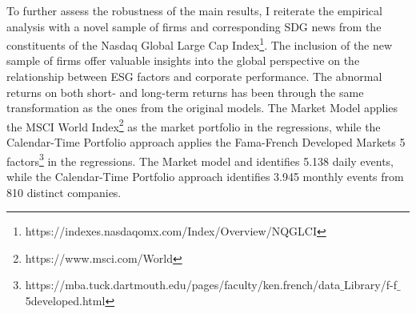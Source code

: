 To further assess the robustness of the main results, I reiterate the empirical analysis with a novel sample of firms and corresponding SDG news from the constituents of the Nasdaq Global Large Cap Index\footnote{https://indexes.nasdaqomx.com/Index/Overview/NQGLCI}. The inclusion of the new sample of firms offer valuable insights into the global perspective on the relationship between ESG factors and corporate performance. The abnormal returns on both short- and long-term returns has been through the same transformation as the ones from the original models. The Market Model applies the MSCI World Index\footnote{https://www.msci.com/World} as the market portfolio in the regressions, while the Calendar-Time Portfolio approach applies the Fama-French Developed Markets 5 factors\footnote{https://mba.tuck.dartmouth.edu/pages/faculty/ken.french/data$\_$Library/f-f$\_$5developed.html} in the regressions. The Market model and identifies 5.138 daily events, while the Calendar-Time Portfolio approach identifies 3.945 monthly events from 810 distinct companies. 

